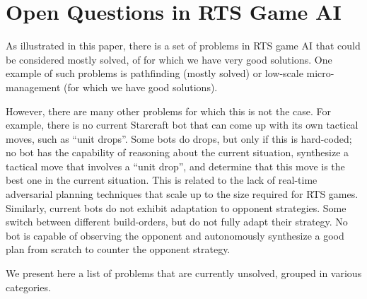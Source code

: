 \documentclass[journal]{IEEEtran}
\begin{document}
\section{Open Questions in RTS Game AI}\label{sec:questions}

As illustrated in this paper, there is a set of problems in RTS game AI that could be considered mostly solved, of for which we have very good solutions. One example of such problems is pathfinding (mostly solved) or low-scale micro-management (for which we have good solutions). 

However, there are many other problems for which this is not the case. For example, there is no current Starcraft bot that can come up with its own tactical moves, such as ``unit drops''. Some bots do drops, but only if this is hard-coded; no bot has the capability of reasoning about the current situation, synthesize a tactical move that involves a ``unit drop'', and determine that this move is the best one in the current situation. This is related to the lack of real-time adversarial planning techniques that scale up to the size required for RTS games. Similarly, current bots do not exhibit adaptation to opponent strategies. Some switch between different build-orders, but do not fully adapt their strategy. No bot is capable of observing the opponent and autonomously synthesize a good plan from scratch to counter the opponent strategy.

We present here a list of problems that are currently unsolved, grouped in various categories.
\end{document}
